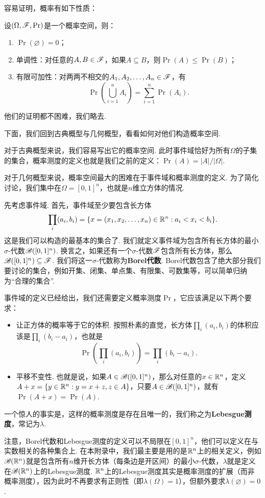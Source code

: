 容易证明，概率有如下性质：
\begin{proposition}
设$(\Omega,\mathscr{F},\Pr)$是一个概率空间，则：
\begin{enumerate}
    \item $\Pr(\varnothing)=0$；
    \item 单调性：对任意的$A,B\in\mathscr{F}$，如果$A\subseteq B$，则$\Pr(A)\leq\Pr(B)$；
    \item 有限可加性：对两两不相交的$A_1,A_2,\dots,A_n\in\mathscr{F}$，有
    \[
        \Pr\left(\bigcup_{i=1}^n A_i\right) = \sum_{i=1}^n \Pr(A_i).
    \]
\end{enumerate}
\end{proposition}

他们的证明都不困难，我们略去. 

下面，我们回到古典概型与几何概型，看看如何对他们构造概率空间.  

对于古典概型来说，我们容易写出它的概率空间. 此时事件域恰好为所有$\Omega$的子集的集合，概率测度的定义也就是我们之前的定义：$\Pr(A)=|A|/|\Omega|$. 

对于几何概型来说，概率空间最大的困难在于事件域和概率测度的定义. 为了简化讨论，我们集中在$\Omega=[0,1]^n$，也就是$n$维立方体的情况. 

先考虑事件域. 首先，事件域至少要包含长方体
\[\prod_i(a_i,b_i)=\{x=(x_1,x_2,\ldots,x_n)\in\mathbb{R}^n:a_i<x_i<b_i\}.\]
这是我们可以构造的最基本的集合了. 我们就定义事件域为包含所有长方体的最小$\sigma$-代数$\mathscr{B}([0,1]^n)$. 换言之，如果还有一个$\sigma$-代数$\mathscr{F}$包含所有长方体，那么$\mathscr{B}([0,1]^n)\subseteq\mathscr{F}$. 我们将这一$\sigma$-代数称为\textbf{Borel代数}. Borel代数包含了绝大部分我们要讨论的集合，例如开集、闭集、单点集、有限集、可数集等，可以简单归纳为“合理的集合”. 

事件域的定义已经给出，我们还需要定义概率测度$\Pr$，它应该满足以下两个要求：
\begin{itemize}
    \item 让正方体的概率等于它的体积. 按照朴素的直觉，长方体$\prod_i(a_i,b_i)$的体积应该是$\prod_i(b_i-a_i)$，也就是
    \[
        \Pr\left(\prod_i(a_i,b_i)\right) = \prod_i(b_i-a_i).
    \]
    \item 平移不变性. 也就是说，如果$A\in\mathscr{B}([0,1]^n)$，那么对任意的$x\in\mathbb{R}^n$，定义$A+x=\{y\in\mathbb{R}^n:y=x+z,z\in A\}$，只要$A\in\mathscr{B}([0,1]^n)$，就有$\Pr(A+x)=\Pr(A)$.
\end{itemize}
一个惊人的事实是，这样的概率测度是存在且唯一的，我们称之为\textbf{Lebesgue测度}，常记为$\lambda$.

注意，Borel代数和Lebesgue测度的定义可以不局限在$[0,1]^n$，他们可以定义在与实数相关的各种集合上. 在本附录中，我们最主要是用的是$\mathbb{R}^n$上的相关定义，例如$\mathscr{B}(\mathbb{R}^n)$就是包含所有$n$维开长方体（每条边是开区间）的最小$\sigma$-代数，$\lambda$就是定义在$\mathscr{B}(\mathbb{R}^n)$上的Lebesgue测度. $\mathbb{R}^n$上的Lebesgue测度其实是概率测度的扩展（而非概率测度），因为此时不再要求有正则性（即$\lambda(\Omega)=1$），但额外要求$\lambda(\varnothing)=0$.

